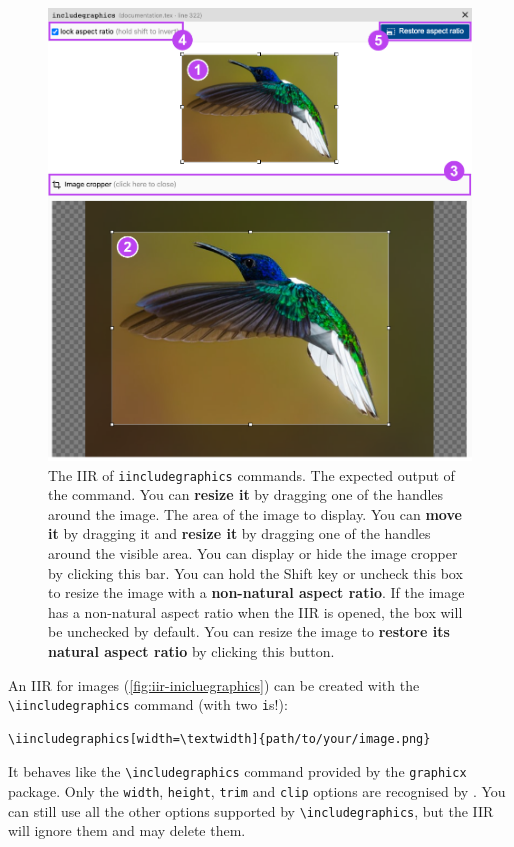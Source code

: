 \documentclass[11pt, a4paper]{article}
\begin{document}
\begin{figure}[h!]
    \centering
    \includegraphics[width = .75\textwidth]{img/iir-iincludegraphics.png}
    \caption{The IIR of \texttt{iincludegraphics} commands.  The expected output of the command. You can \textbf{resize it} by dragging one of the handles around the image.  The area of the image to display. You can \textbf{move it} by dragging it and \textbf{resize it} by dragging one of the handles around the visible area.  You can display or hide the image cropper by clicking this bar.  You can hold the Shift key or uncheck this box to resize the image with a \textbf{non-natural aspect ratio}. If the image has a non-natural aspect ratio when the IIR is opened, the box will be unchecked by default.  You can resize the image to \textbf{restore its natural aspect ratio} by clicking this button.}
    \label{fig:iir-iincludegraphics}
\end{figure}

An IIR for images (\autoref{fig:iir-inicluegraphics}) can be created with the \verb|\iincludegraphics| command (with two \texttt{i}s!):

\begin{lstlisting}[style=custom-latex]
\iincludegraphics[width=\textwidth]{path/to/your/image.png}
\end{lstlisting}

It behaves like the \verb|\includegraphics| command provided by the \texttt{graphicx} package.
Only the \texttt{width}, \texttt{height}, \texttt{trim} and \texttt{clip} options are recognised by \iLaTeX{}.
You can still use all the other options supported by \verb|\includegraphics|, but the IIR will ignore them and may delete them.
\end{document}
